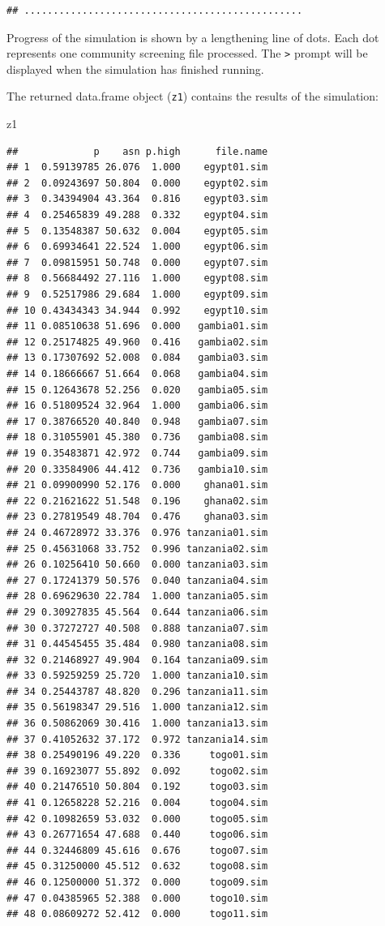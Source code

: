 \documentclass[12pt,a4paper]{book}
\newenvironment{Shaded}{\begin{snugshade}}{\end{snugshade}}
\newcommand{\NormalTok}[1]{#1}
\theoremstyle{definition}
\theoremstyle{definition}
\theoremstyle{definition}
\theoremstyle{remark}
\begin{document}
\begin{verbatim}
## ................................................
\end{verbatim}

Progress of the simulation is shown by a lengthening line of dots. Each
dot represents one community screening file processed. The
\texttt{\textgreater{}} prompt will be displayed when the simulation has
finished running.

The returned data.frame object (\texttt{z1}) contains the results of the
simulation:

\begin{Shaded}
\begin{Highlighting}[]
\NormalTok{z1}
\end{Highlighting}
\end{Shaded}

\begin{verbatim}
##             p    asn p.high      file.name
## 1  0.59139785 26.076  1.000    egypt01.sim
## 2  0.09243697 50.804  0.000    egypt02.sim
## 3  0.34394904 43.364  0.816    egypt03.sim
## 4  0.25465839 49.288  0.332    egypt04.sim
## 5  0.13548387 50.632  0.004    egypt05.sim
## 6  0.69934641 22.524  1.000    egypt06.sim
## 7  0.09815951 50.748  0.000    egypt07.sim
## 8  0.56684492 27.116  1.000    egypt08.sim
## 9  0.52517986 29.684  1.000    egypt09.sim
## 10 0.43434343 34.944  0.992    egypt10.sim
## 11 0.08510638 51.696  0.000   gambia01.sim
## 12 0.25174825 49.960  0.416   gambia02.sim
## 13 0.17307692 52.008  0.084   gambia03.sim
## 14 0.18666667 51.664  0.068   gambia04.sim
## 15 0.12643678 52.256  0.020   gambia05.sim
## 16 0.51809524 32.964  1.000   gambia06.sim
## 17 0.38766520 40.840  0.948   gambia07.sim
## 18 0.31055901 45.380  0.736   gambia08.sim
## 19 0.35483871 42.972  0.744   gambia09.sim
## 20 0.33584906 44.412  0.736   gambia10.sim
## 21 0.09900990 52.176  0.000    ghana01.sim
## 22 0.21621622 51.548  0.196    ghana02.sim
## 23 0.27819549 48.704  0.476    ghana03.sim
## 24 0.46728972 33.376  0.976 tanzania01.sim
## 25 0.45631068 33.752  0.996 tanzania02.sim
## 26 0.10256410 50.660  0.000 tanzania03.sim
## 27 0.17241379 50.576  0.040 tanzania04.sim
## 28 0.69629630 22.784  1.000 tanzania05.sim
## 29 0.30927835 45.564  0.644 tanzania06.sim
## 30 0.37272727 40.508  0.888 tanzania07.sim
## 31 0.44545455 35.484  0.980 tanzania08.sim
## 32 0.21468927 49.904  0.164 tanzania09.sim
## 33 0.59259259 25.720  1.000 tanzania10.sim
## 34 0.25443787 48.820  0.296 tanzania11.sim
## 35 0.56198347 29.516  1.000 tanzania12.sim
## 36 0.50862069 30.416  1.000 tanzania13.sim
## 37 0.41052632 37.172  0.972 tanzania14.sim
## 38 0.25490196 49.220  0.336     togo01.sim
## 39 0.16923077 55.892  0.092     togo02.sim
## 40 0.21476510 50.804  0.192     togo03.sim
## 41 0.12658228 52.216  0.004     togo04.sim
## 42 0.10982659 53.032  0.000     togo05.sim
## 43 0.26771654 47.688  0.440     togo06.sim
## 44 0.32446809 45.616  0.676     togo07.sim
## 45 0.31250000 45.512  0.632     togo08.sim
## 46 0.12500000 51.372  0.000     togo09.sim
## 47 0.04385965 52.388  0.000     togo10.sim
## 48 0.08609272 52.412  0.000     togo11.sim
\end{verbatim}
\end{document}
